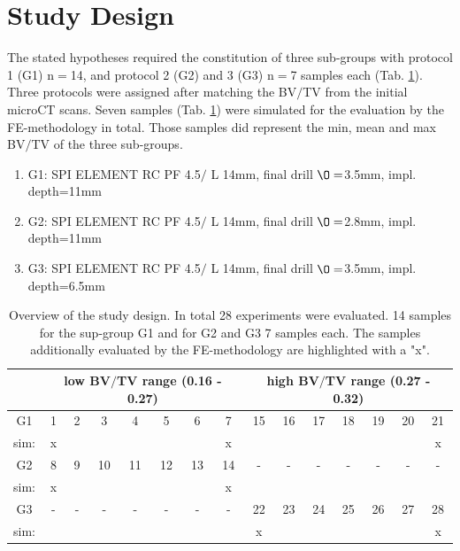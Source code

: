 \documentclass[12pt, a4paper, twoside]{report}
\begin{document}
\section{Study Design}
%
The stated hypotheses required the constitution of three sub-groups with protocol 1 (G1) n$=$14, and protocol 2 (G2) and 3 (G3) n$=$7 samples each (Tab. \ref{tab:StudyDesign}). Three protocols were assigned after matching the BV$/$TV from the initial microCT scans. Seven samples (Tab. \ref{tab:StudyDesign}) were simulated for the evaluation by the FE-methodology in total. Those samples did represent the min, mean and max BV$/$TV of the three sub-groups.\\
%
\begin{enumerate}
	\item G1: SPI ELEMENT RC PF 4.5$/$ L 14mm, final drill $\O=$3.5mm, impl. depth=11mm
	\item G2: SPI ELEMENT RC PF 4.5$/$ L 14mm, final drill $\O=$2.8mm, impl. depth=11mm
	\item G3: SPI ELEMENT RC PF 4.5$/$ L 14mm, final drill $\O=$3.5mm, impl. depth=6.5mm
\end{enumerate}
%
%
\begin{table}[H]
\centering
\begin{tabular}{|c|c|c|c|c|c|c|c|c|c|c|c|c|c|c|}
	\hline 
	 & \multicolumn{7}{c}{low BV$/$TV range (0.16 - 0.27)} & \multicolumn{7}{|c|}{high BV$/$TV range (0.27 		- 0.32)} \\ 
	\hline 
	\hline
	G1 & 1 & 2 & 3 & 4 & 5 & 6 & 7 & 15 & 16 & 17 & 18 & 19 & 20 & 21 \\
	sim: & x & & & & & & x & & & & & & & x \\
	\hline 
	G2 & 8 & 9 & 10 & 11 & 12 & 13 & 14 & - & - & - & - & - & - & - \\ 
	sim: & x & & & & & & x & & & & & & & \\ 
	\hline 
	G3 & - & - & - & - & - & - & - & 22 & 23 & 24 & 25 & 26 & 27 & 28 \\
	sim: & & & & & & & & x & & & & & & x\\
	\hline
\end{tabular}
\caption{Overview of the study design. In total 28 experiments were evaluated. 14 samples for the sup-group G1 and for G2 and G3 7 samples each. The samples additionally evaluated by the FE-methodology are highlighted with a "x".}
\label{tab:StudyDesign}
\end{table} 
%
\newpage
%
%
%
\end{document}
